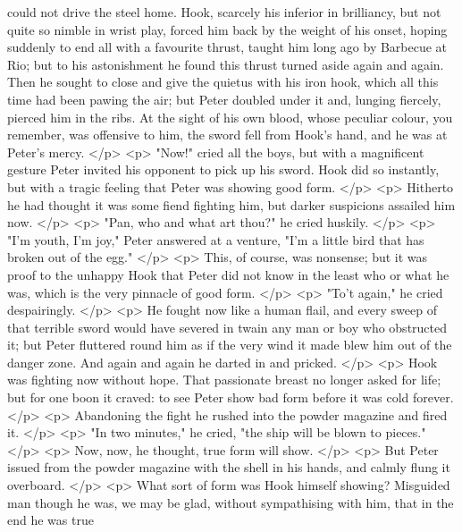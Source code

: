       could not drive the steel home. Hook, scarcely his inferior in brilliancy,
      but not quite so nimble in wrist play, forced him back by the weight of
      his onset, hoping suddenly to end all with a favourite thrust, taught him
      long ago by Barbecue at Rio; but to his astonishment he found this thrust
      turned aside again and again. Then he sought to close and give the quietus
      with his iron hook, which all this time had been pawing the air; but Peter
      doubled under it and, lunging fiercely, pierced him in the ribs. At the
      sight of his own blood, whose peculiar colour, you remember, was offensive
      to him, the sword fell from Hook's hand, and he was at Peter's mercy.
    </p>
    <p>
      "Now!" cried all the boys, but with a magnificent gesture Peter invited
      his opponent to pick up his sword. Hook did so instantly, but with a
      tragic feeling that Peter was showing good form.
    </p>
    <p>
      Hitherto he had thought it was some fiend fighting him, but darker
      suspicions assailed him now.
    </p>
    <p>
      "Pan, who and what art thou?" he cried huskily.
    </p>
    <p>
      "I'm youth, I'm joy," Peter answered at a venture, "I'm a little bird that
      has broken out of the egg."
    </p>
    <p>
      This, of course, was nonsense; but it was proof to the unhappy Hook that
      Peter did not know in the least who or what he was, which is the very
      pinnacle of good form.
    </p>
    <p>
      "To't again," he cried despairingly.
    </p>
    <p>
      He fought now like a human flail, and every sweep of that terrible sword
      would have severed in twain any man or boy who obstructed it; but Peter
      fluttered round him as if the very wind it made blew him out of the danger
      zone. And again and again he darted in and pricked.
    </p>
    <p>
      Hook was fighting now without hope. That passionate breast no longer asked
      for life; but for one boon it craved: to see Peter show bad form before it
      was cold forever.
    </p>
    <p>
      Abandoning the fight he rushed into the powder magazine and fired it.
    </p>
    <p>
      "In two minutes," he cried, "the ship will be blown to pieces."
    </p>
    <p>
      Now, now, he thought, true form will show.
    </p>
    <p>
      But Peter issued from the powder magazine with the shell in his hands, and
      calmly flung it overboard.
    </p>
    <p>
      What sort of form was Hook himself showing? Misguided man though he was,
      we may be glad, without sympathising with him, that in the end he was true
